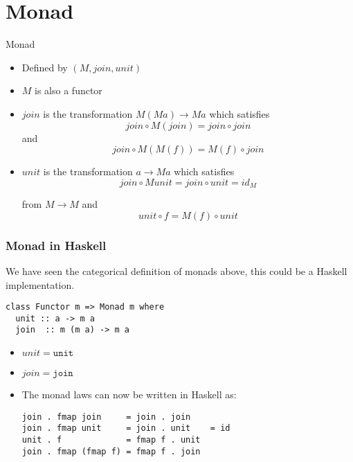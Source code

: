 \documentclass{beamer} %
\begin{document}
\section{Monad}

\begin{frame}{Monad}
  \begin{itemize}
    \item Defined by $(M,\mathit{join},\mathit{unit})$

    \item $M$ is also a functor

    \item $\mathit{join}$ is the transformation $M (M a) \rightarrow M a$ which satisfies
      \[ \mathit{join} \circ M (\mathit{join}) = \mathit{join} \circ \mathit{join}  \]
      and \[ \mathit{join} \circ M(M(f)) = M(f) \circ \mathit{join} \]

    \item $\mathit{unit}$ is the transformation $a \rightarrow M a$ which satisfies
      \[ \mathit{join} \circ M \mathit{unit} = \mathit{join} \circ \mathit{unit}  = id_M \]

      from $M \rightarrow M$ and \[ \mathit{unit} \circ f = M(f) \circ \mathit{unit} \]


  \end{itemize}
\end{frame}

\begin{frame}[fragile]\frametitle{Monad in Haskell}
We have seen the categorical definition of monads above, this could be a
Haskell implementation.
\begin{verbatim}
class Functor m => Monad m where
  unit :: a -> m a
  join  :: m (m a) -> m a
\end{verbatim}
\begin{itemize}
  \item $\mathit{unit} = \texttt{unit}$

  \item $\mathit{join} = \texttt{join}$
  \item The monad laws can now be written in Haskell as:
\begin{verbatim}
join . fmap join     = join . join
join . fmap unit     = join . unit    = id
unit . f             = fmap f . unit
join . fmap (fmap f) = fmap f . join
\end{verbatim}
\end{itemize}
\end{frame}
\end{document}
